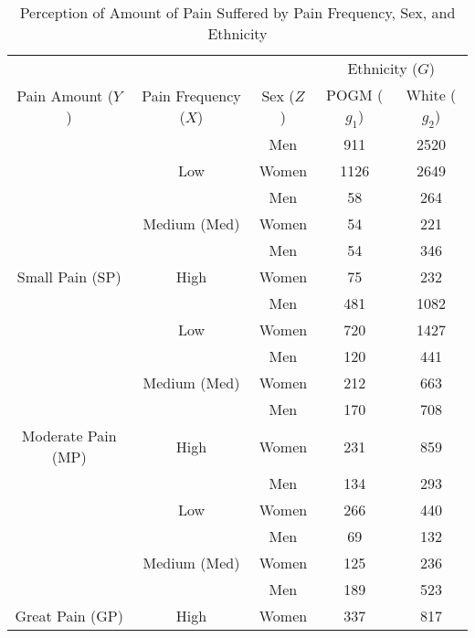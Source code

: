 \documentclass[
]{article}
\begin{document}
\begin{table}[H]

\caption{\label{tab:NHISpain}Perception of Amount of Pain
                    Suffered by Pain Frequency, Sex, and Ethnicity}
\centering
\begin{tabular}[t]{ccccc}
\toprule
\multicolumn{3}{c}{ } & \multicolumn{2}{c}{Ethnicity ($G$)} \\
\cmidrule(l{3pt}r{3pt}){4-5}
Pain Amount ($Y$) & Pain Frequency ($X$) & Sex ($Z$) & POGM ($g_1$) & White ($g_2$)\\
\midrule
 &  & Men & 911 & 2520\\
\cmidrule{3-5}
 & \multirow{-2}{*}{\centering\arraybackslash Low} & Women & 1126 & 2649\\
\cmidrule{2-5}
 &  & Men & 58 & 264\\
\cmidrule{3-5}
 & \multirow{-2}{*}{\centering\arraybackslash Medium (Med)} & Women & 54 & 221\\
\cmidrule{2-5}
 &  & Men & 54 & 346\\
\cmidrule{3-5}
\multirow{-6}{*}{\centering\arraybackslash Small Pain (SP)} & \multirow{-2}{*}{\centering\arraybackslash High} & Women & 75 & 232\\
\cmidrule{1-5}
 &  & Men & 481 & 1082\\
\cmidrule{3-5}
 & \multirow{-2}{*}{\centering\arraybackslash Low} & Women & 720 & 1427\\
\cmidrule{2-5}
 &  & Men & 120 & 441\\
\cmidrule{3-5}
 & \multirow{-2}{*}{\centering\arraybackslash Medium (Med)} & Women & 212 & 663\\
\cmidrule{2-5}
 &  & Men & 170 & 708\\
\cmidrule{3-5}
\multirow{-6}{*}{\centering\arraybackslash Moderate Pain (MP)} & \multirow{-2}{*}{\centering\arraybackslash High} & Women & 231 & 859\\
\cmidrule{1-5}
 &  & Men & 134 & 293\\
\cmidrule{3-5}
 & \multirow{-2}{*}{\centering\arraybackslash Low} & Women & 266 & 440\\
\cmidrule{2-5}
 &  & Men & 69 & 132\\
\cmidrule{3-5}
 & \multirow{-2}{*}{\centering\arraybackslash Medium (Med)} & Women & 125 & 236\\
\cmidrule{2-5}
 &  & Men & 189 & 523\\
\cmidrule{3-5}
\multirow{-6}{*}{\centering\arraybackslash Great Pain (GP)} & \multirow{-2}{*}{\centering\arraybackslash High} & Women & 337 & 817\\
\bottomrule
\end{tabular}
\end{table}
\end{document}
